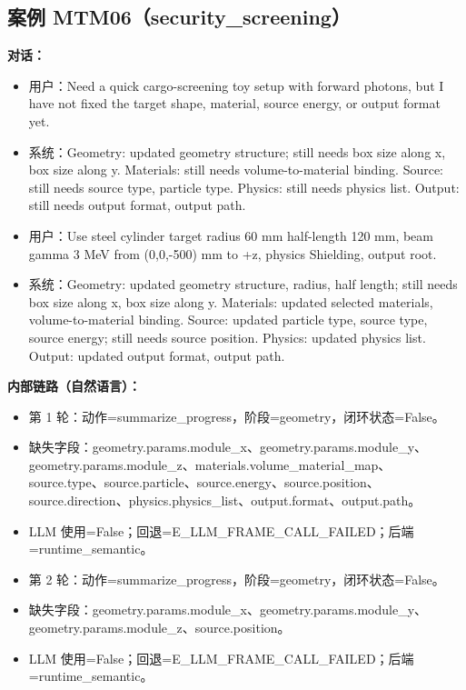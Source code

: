 \documentclass[11pt]{ctexart}
\begin{document}
\subsection{案例 MTM06（security\_screening）}
\textbf{对话：}
\begin{itemize}
\item 用户：Need a quick cargo-screening toy setup with forward photons, but I have not fixed the target shape, material, source energy, or output format yet.
\item 系统：Geometry: updated geometry structure; still needs box size along x, box size along y. Materials: still needs volume-to-material binding. Source: still needs source type, particle type. Physics: still needs physics list. Output: still needs output format, output path.
\item 用户：Use steel cylinder target radius 60 mm half-length 120 mm, beam gamma 3 MeV from (0,0,-500) mm to +z, physics Shielding, output root.
\item 系统：Geometry: updated geometry structure, radius, half length; still needs box size along x, box size along y. Materials: updated selected materials, volume-to-material binding. Source: updated particle type, source type, source energy; still needs source position. Physics: updated physics list. Output: updated output format, output path.
\end{itemize}
\textbf{内部链路（自然语言）：}
\begin{itemize}
\item 第 1 轮：动作=summarize\_progress，阶段=geometry，闭环状态=False。
\item 缺失字段：geometry.params.module\_x、geometry.params.module\_y、geometry.params.module\_z、materials.volume\_material\_map、source.type、source.particle、source.energy、source.position、source.direction、physics.physics\_list、output.format、output.path。
\item LLM 使用=False；回退=E\_LLM\_FRAME\_CALL\_FAILED；后端=runtime\_semantic。
\item 第 2 轮：动作=summarize\_progress，阶段=geometry，闭环状态=False。
\item 缺失字段：geometry.params.module\_x、geometry.params.module\_y、geometry.params.module\_z、source.position。
\item LLM 使用=False；回退=E\_LLM\_FRAME\_CALL\_FAILED；后端=runtime\_semantic。
\end{itemize}
\end{document}
